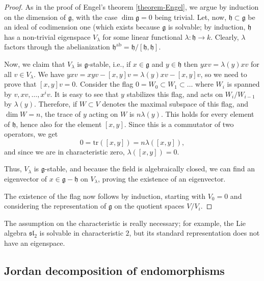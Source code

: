 \begin{proof}
 As in the proof of Engel's theorem \ref{theorem-Engel}, we argue by induction on the dimension of $\mathfrak g$, with the case $\dim \mathfrak g=0$ being trivial. Let, now, $\mathfrak h\subset \mathfrak g$ be an ideal of codimension one (which exists because $\mathfrak g$ is solvable; by induction, $\mathfrak h$ has a non-trivial eigenspace $V_\lambda$ for some linear functional $\lambda: \mathfrak h \to k$. Clearly, $\lambda$ factors through the abelianization 
 $ \mathfrak h^{\text{ab}} = \mathfrak h/[\mathfrak h,\mathfrak h]$.
 
 Now, we claim that $V_\lambda$ is $\mathfrak g$-stable, i.e., if $x\in \mathfrak g$ and $y\in \mathfrak h$ then $yx v = \lambda(y) xv$ for all $v\in V_\lambda$. We have $yx v = xy v -[x,y]v = \lambda(y) xv - [x,y]v$, so we need to prove that $[x,y]v=0$. Consider the flag $0=W_0\subset W_1\subset \dots$ where $W_i$ is spanned by $v, xv, \dots, x^i v$. It is easy to see that $y$ stabilizes this flag, and acts on $W_i/W_{i-1}$ by $\lambda(y)$. Therefore, if $W\subset V$ denotes the maximal subspace of this flag, and $\dim W=n$, the trace of $y$ acting on $W$ is $n\lambda(y)$. This holds for every element of $\mathfrak h$, hence also for the element $[x,y]$. Since this is a commutator of two operators, we get
 $$ 0 = \text{tr}([x,y]) = n \lambda([x,y]),$$
 and since we are in characteristic zero, $\lambda([x,y]) = 0$. 
 
 Thus, $V_\lambda$ is $\mathfrak g$-stable, and because the field is algebraically closed, we can find an eigenvector of $x \in \mathfrak g - \mathfrak h$ on $V_\lambda$, proving the existence of an eigenvector.
 
 The existence of the flag now follows by induction, starting with $V_0=0$ and considering the representation of $\mathfrak g$ on the quotient spaces $V/V_i$.
\end{proof}


\begin{remark}
 \label{remark-Lie-positive-characteristic}
The assumption on the characteristic is really necessary; for example, the Lie algebra $\mathfrak{sl}_2$ is solvable in characteristic $2$, but its standard representation does not have an eigenspace.
\end{remark}





\subsection{Jordan decomposition of endomorphisms}
\label{subsection-Jordan-endomorphisms}

